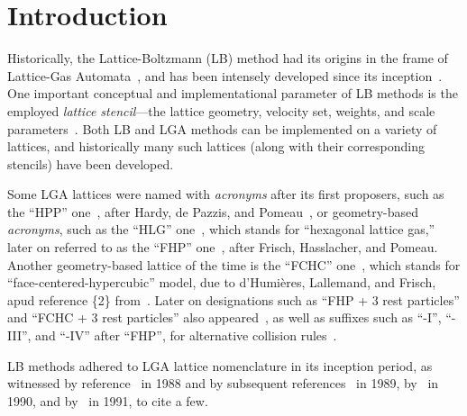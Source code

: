 \section{Introduction}

    Historically,   the   Lattice-Boltzmann   (LB)    method    had    its    origins    in    the    frame    of    Lattice-Gas
    Automata~\cite{1988-McNamaraGR+ZanettiG-PhysRevLett},     and     has     been     intensely     developed     since     its
    inception~\cite{2018-KrugerT+ViggenEM-Springer}. One important conceptual and implementational parameter of  LB  methods  is
    the    employed    \emph{lattice    stencil}---the    lattice    geometry,    velocity    set,    weights,     and     scale
    parameters~\cite{2013-HegeleJr+PhilippiPC-JSciComput,                                2013-MattilaKK+PhilippiPC-IntJModPhysC,
    2014-MattilaKK+PhilippiPC-SciWorldJ}. Both LB and LGA methods can be implemented on a variety of lattices, and  historically
    many such lattices (along with their corresponding stencils) have been developed.

    Some   LGA   lattices   were   named   with   \emph{acronyms}   after   its   first   proposers,   such   as   the   ``HPP''
    one~\cite{1986-FrischU+PomeauY-PhysRevLett},  after  Hardy,  de  Pazzis,   and   Pomeau~\cite{1973-HardyJ+PazzisO-JMathPhys,
    1976-HardyJ+PomeauY-PhysRevA,  1987-SucciS-JPhysAMathGen},  or  geometry-based  \emph{acronyms},   such   as   the   ``HLG''
    one~\cite{1986-FrischU+PomeauY-PhysRevLett}, which stands for ``hexagonal lattice gas,'' later on referred to as the ``FHP''
    one~\cite{1987-FrischU+RivetJP-ComplexSyst,  1987-SucciS-JPhysAMathGen},  after  Frisch,  Hasslacher,  and  Pomeau.  Another
    geometry-based  lattice  of  the  time  is  the  ``FCHC''  one~\cite{1987-FrischU+RivetJP-ComplexSyst},  which  stands   for
    ``face-centered-hypercubic''   model,   due   to   d'Humières,    Lallemand,    and    Frisch,    apud    reference    \{2\}
    from~\cite{1987-FrischU+RivetJP-ComplexSyst}. Later on designations such as ``FHP + 3 rest particles'' and ``FCHC +  3  rest
    particles'' also appeared~\cite{1991-BoonJP-PhysD}, as well as suffixes such as ``-I'', ``-III'', and ``-IV'' after ``FHP'',
    for alternative collision rules~\cite{1991-AppertC+ZaleskiS-PhysD, 1991-BoonJP-PhysD, 1991-ChenS+RoseH-PhysD}.

    LB   methods   adhered    to    LGA    lattice    nomenclature    in    its    inception    period,    as    witnessed    by
    reference~\cite{1988-McNamaraGR+ZanettiG-PhysRevLett}          in          1988          and          by          subsequent
    references~\cite{1989-HigueraFJ+JimenezJ-EurophysLett,         1989-HigueraFJ+SucciS-EurophysLett}         in          1989,
    by~\cite{1990-BenziR+VergassolaM-EurophysLett,   1990-BenziR+VergassolaM-NuclPhysB,    1990-CancelliereA+SucciS-PhysFluidsA,
    1990-VergassolaM+SucciS-EurophysLett}   in   1990,   and   by~\cite{1991-CornubertR+LevermoreD-PhysD,    1991-ErnstMH-PhysD,
    1991-FrischU-PhysD, 1991-GunstensenAK+ZanettiG-PhysRevA, 1991-SucciS+BenziR-PhysRevA} in 1991, to cite a few.

